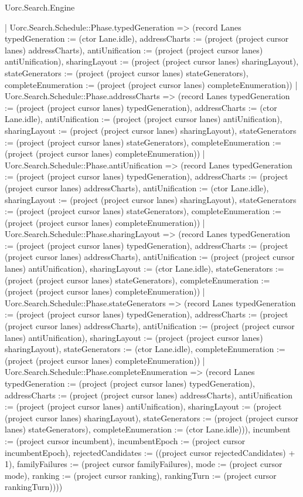 \begin{lexlean}{Uorc.Search.Engine}
\begin{semanticmodule}
{{        | Uorc.Search.Schedule::Phase.typedGeneration => (record Lanes {typedGeneration := (ctor Lane.idle), addressCharts := (project (project cursor lanes) addressCharts), antiUnification := (project (project cursor lanes) antiUnification), sharingLayout := (project (project cursor lanes) sharingLayout), stateGenerators := (project (project cursor lanes) stateGenerators), completeEnumeration := (project (project cursor lanes) completeEnumeration)})
        | Uorc.Search.Schedule::Phase.addressCharts => (record Lanes {typedGeneration := (project (project cursor lanes) typedGeneration), addressCharts := (ctor Lane.idle), antiUnification := (project (project cursor lanes) antiUnification), sharingLayout := (project (project cursor lanes) sharingLayout), stateGenerators := (project (project cursor lanes) stateGenerators), completeEnumeration := (project (project cursor lanes) completeEnumeration)})
        | Uorc.Search.Schedule::Phase.antiUnification => (record Lanes {typedGeneration := (project (project cursor lanes) typedGeneration), addressCharts := (project (project cursor lanes) addressCharts), antiUnification := (ctor Lane.idle), sharingLayout := (project (project cursor lanes) sharingLayout), stateGenerators := (project (project cursor lanes) stateGenerators), completeEnumeration := (project (project cursor lanes) completeEnumeration)})
        | Uorc.Search.Schedule::Phase.sharingLayout => (record Lanes {typedGeneration := (project (project cursor lanes) typedGeneration), addressCharts := (project (project cursor lanes) addressCharts), antiUnification := (project (project cursor lanes) antiUnification), sharingLayout := (ctor Lane.idle), stateGenerators := (project (project cursor lanes) stateGenerators), completeEnumeration := (project (project cursor lanes) completeEnumeration)})
        | Uorc.Search.Schedule::Phase.stateGenerators => (record Lanes {typedGeneration := (project (project cursor lanes) typedGeneration), addressCharts := (project (project cursor lanes) addressCharts), antiUnification := (project (project cursor lanes) antiUnification), sharingLayout := (project (project cursor lanes) sharingLayout), stateGenerators := (ctor Lane.idle), completeEnumeration := (project (project cursor lanes) completeEnumeration)})
        | Uorc.Search.Schedule::Phase.completeEnumeration => (record Lanes {typedGeneration := (project (project cursor lanes) typedGeneration), addressCharts := (project (project cursor lanes) addressCharts), antiUnification := (project (project cursor lanes) antiUnification), sharingLayout := (project (project cursor lanes) sharingLayout), stateGenerators := (project (project cursor lanes) stateGenerators), completeEnumeration := (ctor Lane.idle)})), incumbent := (project cursor incumbent), incumbentEpoch := (project cursor incumbentEpoch), rejectedCandidates := ((project cursor rejectedCandidates) + 1), familyFailures := (project cursor familyFailures), mode := (project cursor mode), ranking := (project cursor ranking), rankingTurn := (project cursor rankingTurn)})))
}
\end{semanticmodule}
\end{lexlean}
